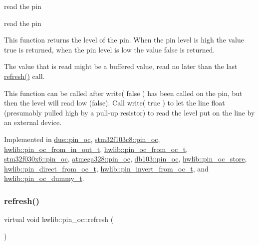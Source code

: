 read the pin

read the pin

This function returns the level of the pin. When the pin level is high the value true is returned, when the pin level is low the value false is returned.

The value that is read might be a buffered value, read no later than the last \hyperlink{classhwlib_1_1pin__oc_a573740f6f790c5792efc9cdd44cc73b3}{refresh()} call.

This function can be called after write( false ) has been called on the pin, but then the level will read low (false). Call write( true ) to let the line float (presumably pulled high by a pull-\/up resistor) to read the level put on the line by an external device. 

Implemented in \hyperlink{classdue_1_1pin__oc_a2b9121a384b5645253b799e54417c5ca}{due\+::pin\+\_\+oc}, \hyperlink{classstm32f103c8_1_1pin__oc_ae733a459b1f10ca38ac20f2d60923833}{stm32f103c8\+::pin\+\_\+oc}, \hyperlink{classhwlib_1_1pin__oc__from__in__out__t_ae1e2dcf630d637e8d31e9942f7323a2b}{hwlib\+::pin\+\_\+oc\+\_\+from\+\_\+in\+\_\+out\+\_\+t}, \hyperlink{classhwlib_1_1pin__oc__from__oc__t_aa896dfa412fe5644e0096b38c739cd42}{hwlib\+::pin\+\_\+oc\+\_\+from\+\_\+oc\+\_\+t}, \hyperlink{classstm32f030x6_1_1pin__oc_a97615ebdacdd8405e87f8f6440e5fce1}{stm32f030x6\+::pin\+\_\+oc}, \hyperlink{classatmega328_1_1pin__oc_a89733673f7d2e2e96b2b71dbabf4505a}{atmega328\+::pin\+\_\+oc}, \hyperlink{classdb103_1_1pin__oc_ae48de2077c383bcab947278ee6564398}{db103\+::pin\+\_\+oc}, \hyperlink{classhwlib_1_1pin__oc__store_a20ffb88febe8d86f2686ed937ab6bc5a}{hwlib\+::pin\+\_\+oc\+\_\+store}, \hyperlink{classhwlib_1_1pin__direct__from__oc__t_af9243ffeb3095cefb13b7a3daf209339}{hwlib\+::pin\+\_\+direct\+\_\+from\+\_\+oc\+\_\+t}, \hyperlink{classhwlib_1_1pin__invert__from__oc__t_a650ed38934b4585f42c756edd19b9c67}{hwlib\+::pin\+\_\+invert\+\_\+from\+\_\+oc\+\_\+t}, and \hyperlink{classhwlib_1_1pin__oc__dummy__t_a53c06f28f7885d1bed4d29cb15aa4b33}{hwlib\+::pin\+\_\+oc\+\_\+dummy\+\_\+t}.

\mbox{\label{classhwlib_1_1pin__oc_a573740f6f790c5792efc9cdd44cc73b3}} 
\subsubsection{\texorpdfstring{refresh()}{refresh()}}
{\footnotesize\ttfamily virtual void hwlib\+::pin\+\_\+oc\+::refresh (\begin{DoxyParamCaption}{ }\end{DoxyParamCaption})\hspace{0.3cm}{\ttfamily [pure virtual]}}






